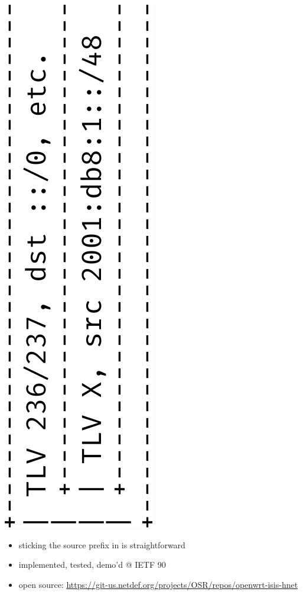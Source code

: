 \documentclass[12pt]{beamer}
\begin{document}
\begin{frame}
  \includegraphics[scale=0.45,angle=-90]{isis_dstsrc_tlv.pdf}%
  \vspace{6mm}
  \begin{itemize}
    \item sticking the source prefix in is straightforward
    \item implemented, tested, demo'd @ IETF 90
    \item open source: \url{https://git-us.netdef.org/projects/OSR/repos/openwrt-isis-hnet}
  \end{itemize}
\end{frame}
\end{document}
